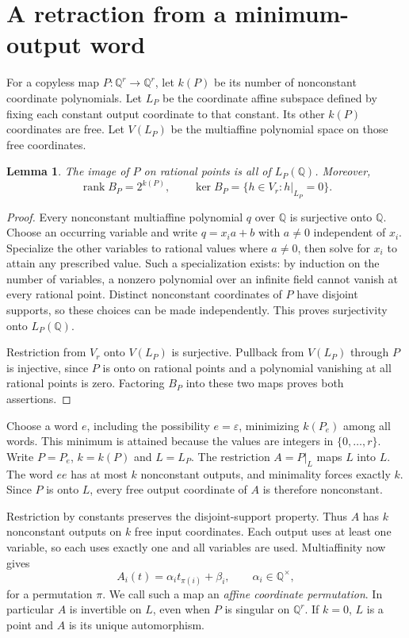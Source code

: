 \documentclass[acmlarge,screen,11pt,nonacm]{acmart}
\newcommand{\Q}{\mathbb{Q}}
\newcommand{\eps}{\varepsilon}
\newtheorem{lemma}[theorem]{Lemma}
\theoremstyle{definition}
\begin{document}
\section{A retraction from a minimum-output word}\label{sec:retraction}
For a copyless map $P:\Q^r\to\Q^r$, let $k(P)$ be its number of nonconstant coordinate polynomials. Let $L_P$ be the coordinate affine subspace defined by fixing each constant output coordinate to that constant. Its other $k(P)$ coordinates are free. Let $V(L_P)$ be the multiaffine polynomial space on those free coordinates.

\begin{lemma}\label{lem:image}
The image of $P$ on rational points is all of $L_P(\Q)$. Moreover,
\[
 \operatorname{rank}B_P=2^{k(P)},\qquad
 \ker B_P=\{h\in V_r:h|_{L_P}=0\}.
\]
\end{lemma}
\begin{proof}
Every nonconstant multiaffine polynomial $q$ over $\Q$ is surjective onto $\Q$. Choose an occurring variable and write $q=x_i a+b$ with $a\ne0$ independent of $x_i$. Specialize the other variables to rational values where $a\ne0$, then solve for $x_i$ to attain any prescribed value. Such a specialization exists: by induction on the number of variables, a nonzero polynomial over an infinite field cannot vanish at every rational point. Distinct nonconstant coordinates of $P$ have disjoint supports, so these choices can be made independently. This proves surjectivity onto $L_P(\Q)$.

Restriction from $V_r$ onto $V(L_P)$ is surjective. Pullback from $V(L_P)$ through $P$ is injective, since $P$ is onto on rational points and a polynomial vanishing at all rational points is zero. Factoring $B_P$ into these two maps proves both assertions.
\end{proof}

Choose a word $e$, including the possibility $e=\eps$, minimizing $k(P_e)$ among all words. This minimum is attained because the values are integers in $\{0,\ldots,r\}$. Write $P=P_e$, $k=k(P)$ and $L=L_P$. The restriction $A=P|_L$ maps $L$ into $L$. The word $ee$ has at most $k$ nonconstant outputs, and minimality forces exactly $k$. Since $P$ is onto $L$, every free output coordinate of $A$ is therefore nonconstant.

Restriction by constants preserves the disjoint-support property. Thus $A$ has $k$ nonconstant outputs on $k$ free input coordinates. Each output uses at least one variable, so each uses exactly one and all variables are used. Multiaffinity now gives
\begin{equation}\label{eq:affineperm}
 A_i(t)=\alpha_i t_{\pi(i)}+\beta_i,\qquad \alpha_i\in\Q^\times,
\end{equation}
for a permutation $\pi$. We call such a map an \emph{affine coordinate permutation}. In particular $A$ is invertible on $L$, even when $P$ is singular on $\Q^r$. If $k=0$, $L$ is a point and $A$ is its unique automorphism.
\end{document}
